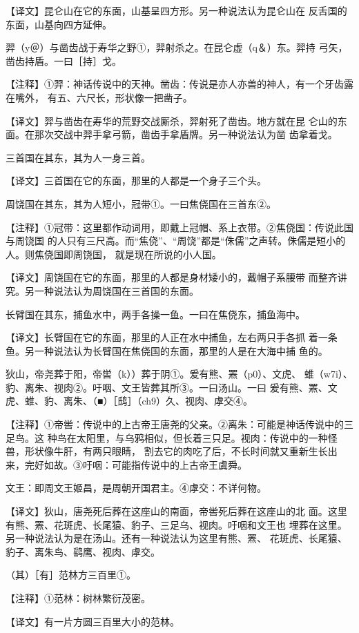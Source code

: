 \documentclass[a4paper,12pt,UTF8,twoside]{ctexbook}
\begin{document}
【译文】昆仑山在它的东面，山基呈四方形。另一种说法认为昆仑山在 反舌国的东面，山基向四方延伸。

羿（y＠）与凿齿战于寿华之野①，羿射杀之。在昆仑虚（q＆）东。羿持 弓矢，凿齿持盾。一曰［持］戈。

【注释】①羿：神话传说中的天神。凿齿：传说是亦人亦兽的神人，有一个牙齿露在嘴外， 有五、六尺长，形状像一把凿子。

【译文】羿与凿齿在寿华的荒野交战厮杀，羿射死了凿齿。地方就在昆 仑山的东面。在那次交战中羿手拿弓箭，凿齿手拿盾牌。另一种说法认为凿 齿拿着戈。

三首国在其东，其为人一身三首。

【译文】三首国在它的东面，那里的人都是一个身子三个头。

周饶国在其东，其为人短小，冠带①。一曰焦侥国在三首东②。

【注释】①冠带：这里都作动词用，即戴上冠帽、系上衣带。②焦侥国：传说此国与周饶国 的人只有三尺高。而“焦侥”、“周饶”都是“侏儒”之声转。侏儒是短小的人。则焦侥国即周饶国， 就是现在所说的小人国。

【译文】周饶国在它的东面，那里的人都是身材矮小的，戴帽子系腰带 而整齐讲究。另一种说法认为周饶国在三首国的东面。

长臂国在其东，捕鱼水中，两手各操一鱼。一曰在焦侥东，捕鱼海中。

【译文】长臂国在它的东面，那里的人正在水中捕鱼，左右两只手各抓 着一条鱼。另一种说法认为长臂国在焦侥国的东面，那里的人是在大海中捕 鱼的。

狄山，帝尧葬于阳，帝喾（k））葬于阴①。爰有熊、罴（p0）、文虎、 蜼（w7i）、豹、离朱、视肉②。吁咽、文王皆葬其所③。一曰汤山。一曰 爰有熊、罴、文虎、蜼、豹、离朱、（■）［鸱］（ch9）久、视肉、虖交④。

【注释】①帝喾：传说中的上古帝王唐尧的父亲。②离朱：可能是神话传说中的三足鸟。这 种鸟在太阳里，与乌鸦相似，但长着三只足。视肉：传说中的一种怪兽，形状像牛肝，有两只眼睛， 割去它的肉吃了后，不长时间就又重新生长出来，完好如故。③吁咽：可能指传说中的上古帝王虞舜。

文王：即周文王姬昌，是周朝开国君主。④虖交：不详何物。

【译文】狄山，唐尧死后葬在这座山的南面，帝喾死后葬在这座山的北 面。这里有熊、罴、花斑虎、长尾猿、豹子、三足乌、视肉。吁咽和文王也 埋葬在这里。另一种说法认为是在汤山。还有一种说法认为这里有熊、罴、 花斑虎、长尾猿、豹子、离朱鸟、鹞鹰、视肉、虖交。

（其）［有］范林方三百里①。

【注释】①范林：树林繁衍茂密。

【译文】有一片方圆三百里大小的范林。
\end{document}
